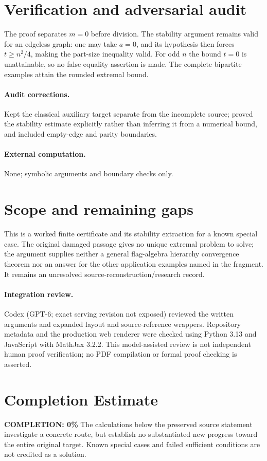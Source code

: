 \documentclass[11pt]{article}
\begin{document}
\section{Verification and adversarial audit}

The proof separates $m=0$ before division. The stability argument remains valid
for an edgeless graph: one may take $a=0$, and its hypothesis then forces
$t\geq n^2/4$, making the part-size inequality valid. For odd $n$ the bound
$t=0$ is unattainable, so no false equality assertion is made. The complete
bipartite examples attain the rounded extremal bound.

\paragraph{Audit corrections.} Kept the classical auxiliary target separate from the incomplete source;
proved the stability estimate explicitly rather than inferring it from a numerical
bound, and included empty-edge and parity boundaries.
\paragraph{External computation.} None; symbolic arguments and boundary checks only.
\section{Scope and remaining gaps}

This is a worked finite certificate and its stability extraction for a known
special case. The original damaged passage gives no unique extremal problem
to solve; the argument supplies neither a general flag-algebra hierarchy
convergence theorem nor an answer for the other application examples named in
the fragment. It remains an unresolved source-reconstruction/research record.

\paragraph{Integration review.} Codex (GPT-6; exact serving revision not exposed) reviewed the written arguments and expanded layout and source-reference wrappers. Repository metadata and the production web renderer were checked using Python 3.13 and JavaScript with MathJax 3.2.2. This model-assisted review is not independent human proof verification; no PDF compilation or formal proof checking is asserted.

\section{Completion Estimate}
\noindent\textbf{COMPLETION: 0\%}
The calculations below the preserved source statement investigate a concrete route,
but establish no substantiated new progress toward the entire original target.
Known special cases and failed sufficient conditions are not credited as a solution.
\end{document}

